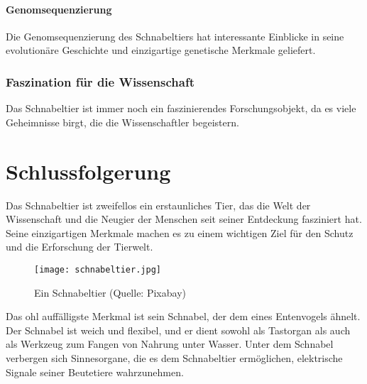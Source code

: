 \documentclass{article}
\begin{document}
        \subsection{Genomsequenzierung}
        Die Genomsequenzierung des Schnabeltiers hat interessante Einblicke in seine evolutionäre Geschichte und einzigartige genetische Merkmale geliefert.

    \section{Faszination für die Wissenschaft}
    Das Schnabeltier ist immer noch ein faszinierendes Forschungsobjekt, da es viele Geheimnisse birgt, die die Wissenschaftler begeistern.


\part{Schlussfolgerung}
    Das Schnabeltier ist zweifellos ein erstaunliches Tier, das die Welt der Wissenschaft und die Neugier der Menschen seit seiner Entdeckung fasziniert hat. Seine einzigartigen Merkmale machen es zu einem wichtigen Ziel für den Schutz und die Erforschung der Tierwelt.

    \begin{figure}[h]
      \centering
      \texttt{[image: schnabeltier.jpg]}
      \caption{Ein Schnabeltier (Quelle: Pixabay)}
    \end{figure}

    Das ohl auffälligste Merkmal ist sein Schnabel, der dem eines Entenvogels ähnelt. Der Schnabel ist weich und flexibel, und er dient sowohl als Tastorgan als auch als Werkzeug zum Fangen von Nahrung unter Wasser. Unter dem Schnabel verbergen sich Sinnesorgane, die es dem Schnabeltier ermöglichen, elektrische Signale seiner Beutetiere wahrzunehmen.
    
\end{document}
